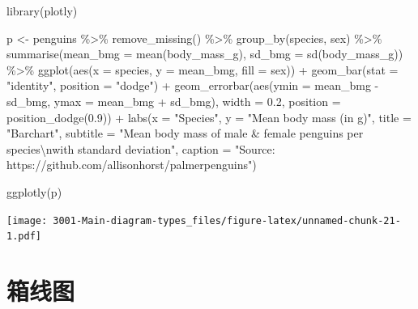 \documentclass[
]{book}
\newenvironment{Shaded}{\begin{snugshade}}{\end{snugshade}}
\newcommand{\AttributeTok}[1]{\textcolor[rgb]{0.77,0.63,0.00}{#1}}
\newcommand{\FloatTok}[1]{\textcolor[rgb]{0.00,0.00,0.81}{#1}}
\newcommand{\FunctionTok}[1]{\textcolor[rgb]{0.00,0.00,0.00}{#1}}
\newcommand{\NormalTok}[1]{#1}
\newcommand{\OtherTok}[1]{\textcolor[rgb]{0.56,0.35,0.01}{#1}}
\newcommand{\SpecialCharTok}[1]{\textcolor[rgb]{0.00,0.00,0.00}{#1}}
\newcommand{\StringTok}[1]{\textcolor[rgb]{0.31,0.60,0.02}{#1}}
\begin{document}
\begin{Shaded}
\begin{Highlighting}[]
\FunctionTok{library}\NormalTok{(plotly)}

\NormalTok{p }\OtherTok{\textless{}{-}}\NormalTok{ penguins }\SpecialCharTok{\%\textgreater{}\%}
    \FunctionTok{remove\_missing}\NormalTok{() }\SpecialCharTok{\%\textgreater{}\%}
    \FunctionTok{group\_by}\NormalTok{(species, sex) }\SpecialCharTok{\%\textgreater{}\%}
    \FunctionTok{summarise}\NormalTok{(}\AttributeTok{mean\_bmg =} \FunctionTok{mean}\NormalTok{(body\_mass\_g),}
              \AttributeTok{sd\_bmg =} \FunctionTok{sd}\NormalTok{(body\_mass\_g)) }\SpecialCharTok{\%\textgreater{}\%}
    \FunctionTok{ggplot}\NormalTok{(}\FunctionTok{aes}\NormalTok{(}\AttributeTok{x =}\NormalTok{ species, }\AttributeTok{y =}\NormalTok{ mean\_bmg,}
               \AttributeTok{fill =}\NormalTok{ sex)) }\SpecialCharTok{+}
    \FunctionTok{geom\_bar}\NormalTok{(}\AttributeTok{stat =} \StringTok{"identity"}\NormalTok{, }\AttributeTok{position =} \StringTok{"dodge"}\NormalTok{) }\SpecialCharTok{+}
    \FunctionTok{geom\_errorbar}\NormalTok{(}\FunctionTok{aes}\NormalTok{(}\AttributeTok{ymin =}\NormalTok{ mean\_bmg }\SpecialCharTok{{-}}\NormalTok{ sd\_bmg, }
                      \AttributeTok{ymax =}\NormalTok{ mean\_bmg }\SpecialCharTok{+}\NormalTok{ sd\_bmg), }
                  \AttributeTok{width =} \FloatTok{0.2}\NormalTok{,}
                 \AttributeTok{position =} \FunctionTok{position\_dodge}\NormalTok{(}\FloatTok{0.9}\NormalTok{)) }\SpecialCharTok{+}
      \FunctionTok{labs}\NormalTok{(}\AttributeTok{x =} \StringTok{"Species"}\NormalTok{, }
           \AttributeTok{y =} \StringTok{"Mean body mass (in g)"}\NormalTok{,}
          \AttributeTok{title =} \StringTok{"Barchart"}\NormalTok{, }
          \AttributeTok{subtitle =} \StringTok{"Mean body mass of male \& female penguins per species}\SpecialCharTok{\textbackslash{}n}\StringTok{with standard deviation"}\NormalTok{,}
          \AttributeTok{caption =} \StringTok{"Source: https://github.com/allisonhorst/palmerpenguins"}\NormalTok{)}

\FunctionTok{ggplotly}\NormalTok{(p)}
\end{Highlighting}
\end{Shaded}

\texttt{[image: 3001-Main-diagram-types\_files/figure-latex/unnamed-chunk-21-1.pdf]}

\hypertarget{ux7bb1ux7ebfux56fe-1}{%
\section{箱线图}\label{ux7bb1ux7ebfux56fe-1}}
\end{document}
